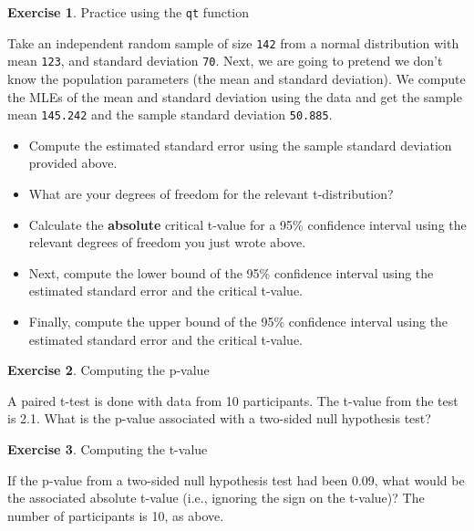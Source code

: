 \documentclass[
  12pt,
]{krantz}
\providecommand{\tightlist}{%
  \setlength{\itemsep}{0pt}\setlength{\parskip}{0pt}}
\theoremstyle{definition}
\theoremstyle{definition}
\theoremstyle{definition}
\newtheorem{exercise}{Exercise}[chapter]
\theoremstyle{definition}
\theoremstyle{remark}
\begin{document}
\begin{exercise}
\protect\hypertarget{exr:SamplingDistrnexercisesqt}{}\label{exr:SamplingDistrnexercisesqt}Practice using the \texttt{qt} function
\end{exercise}

Take an independent random sample of size \texttt{142} from a normal distribution
with mean \texttt{123}, and standard deviation \texttt{70}. Next, we are going to pretend we don't know the population parameters (the mean and standard deviation). We compute the MLEs of the mean and standard deviation using the data and get the sample mean \texttt{145.242} and the sample standard deviation \texttt{50.885}.

\begin{itemize}
\tightlist
\item
  Compute the estimated standard error using the sample standard deviation provided above.
\item
  What are your degrees of freedom for the relevant t-distribution?
\item
  Calculate the \textbf{absolute} critical t-value for a 95\% confidence interval using the relevant degrees of freedom you just wrote above.
\item
  Next, compute the lower bound of the 95\% confidence interval using the estimated standard error and the critical t-value.
\item
  Finally, compute the upper bound of the 95\% confidence interval using the estimated standard error and the critical t-value.
\end{itemize}

\begin{exercise}
\protect\hypertarget{exr:SamplingDistrnexercisespvalue}{}\label{exr:SamplingDistrnexercisespvalue}Computing the p-value
\end{exercise}

A paired t-test is done with data from 10 participants. The t-value from the test is 2.1. What is the p-value associated with a two-sided null hypothesis test?

\begin{exercise}
\protect\hypertarget{exr:SamplingDistrnexercisestvalue}{}\label{exr:SamplingDistrnexercisestvalue}Computing the t-value
\end{exercise}

If the p-value from a two-sided null hypothesis test had been 0.09, what would be the associated absolute t-value (i.e., ignoring the sign on the t-value)? The number of participants is 10, as above.
\end{document}
